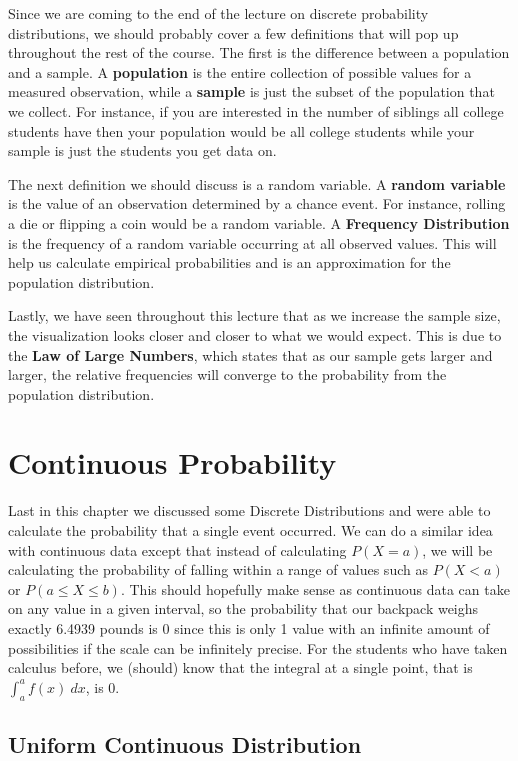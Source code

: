 \documentclass[
  letterpaper,
  DIV=11,
  numbers=noendperiod]{scrreprt}
\begin{document}
Since we are coming to the end of the lecture on discrete probability
distributions, we should probably cover a few definitions that will pop
up throughout the rest of the course. The first is the difference
between a population and a sample. A \textbf{population} is the entire
collection of possible values for a measured observation, while a
\textbf{sample} is just the subset of the population that we collect.
For instance, if you are interested in the number of siblings all
college students have then your population would be all college students
while your sample is just the students you get data on.

The next definition we should discuss is a random variable. A
\textbf{random variable} is the value of an observation determined by a
chance event. For instance, rolling a die or flipping a coin would be a
random variable. A \textbf{Frequency Distribution} is the frequency of a
random variable occurring at all observed values. This will help us
calculate empirical probabilities and is an approximation for the
population distribution.

Lastly, we have seen throughout this lecture that as we increase the
sample size, the visualization looks closer and closer to what we would
expect. This is due to the \textbf{Law of Large Numbers}, which states
that as our sample gets larger and larger, the relative frequencies will
converge to the probability from the population distribution.

\section{Continuous Probability}\label{continuous-probability}

Last in this chapter we discussed some Discrete Distributions and were
able to calculate the probability that a single event occurred. We can
do a similar idea with continuous data except that instead of
calculating \(P(X=a)\), we will be calculating the probability of
falling within a range of values such as \(P(X<a)\) or
\(P(a\leq X \leq b)\). This should hopefully make sense as continuous
data can take on any value in a given interval, so the probability that
our backpack weighs exactly 6.4939 pounds is 0 since this is only 1
value with an infinite amount of possibilities if the scale can be
infinitely precise. For the students who have taken calculus before, we
(should) know that the integral at a single point, that is
\(\int_a^a f(x)\ dx\), is 0.

\subsection{Uniform Continuous
Distribution}\label{uniform-continuous-distribution}
\end{document}
